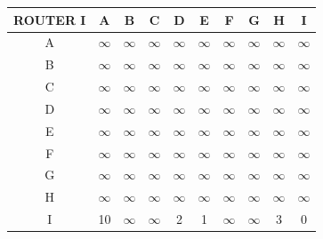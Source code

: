 \documentclass{article}
\begin{document}
\begin{tabular}{ | c | c | c | c | c | c | c | c | c | c |}
\hline                 
ROUTER I    & A      & B      & C      & D      & E      & F      & G      & H      & I      \\
\hline
        A   &$\infty$&$\infty$&$\infty$&$\infty$&$\infty$&$\infty$&$\infty$&$\infty$&$\infty$\\
\hline
        B   &$\infty$&$\infty$&$\infty$&$\infty$&$\infty$&$\infty$&$\infty$&$\infty$&$\infty$\\
\hline
        C   &$\infty$&$\infty$&$\infty$&$\infty$&$\infty$&$\infty$&$\infty$&$\infty$&$\infty$\\
\hline
        D   &$\infty$&$\infty$&$\infty$&$\infty$&$\infty$&$\infty$&$\infty$&$\infty$&$\infty$\\
\hline
        E   &$\infty$&$\infty$&$\infty$&$\infty$&$\infty$&$\infty$&$\infty$&$\infty$&$\infty$\\
\hline
        F   &$\infty$&$\infty$&$\infty$&$\infty$&$\infty$&$\infty$&$\infty$&$\infty$&$\infty$\\
\hline
        G   &$\infty$&$\infty$&$\infty$&$\infty$&$\infty$&$\infty$&$\infty$&$\infty$&$\infty$\\
\hline
        H   &$\infty$&$\infty$&$\infty$&$\infty$&$\infty$&$\infty$&$\infty$&$\infty$&$\infty$\\
\hline 
        I   & 10     &$\infty$&$\infty$& 2      & 1      &$\infty$&$\infty$& 3      & 0      \\
\hline
\end{tabular}
\end{document}
